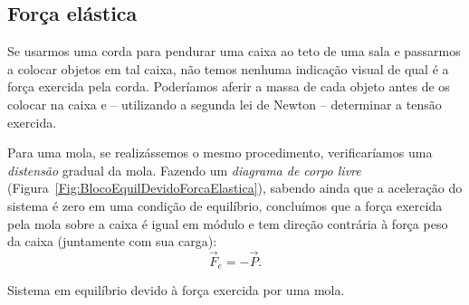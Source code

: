\subsection{Força elástica}

Se usarmos uma corda para pendurar uma caixa ao teto de uma sala e passarmos a colocar objetos em tal caixa, não temos nenhuma indicação visual de qual é a força exercida pela corda. Poderíamos aferir a massa de cada objeto antes de os colocar na caixa e -- utilizando a segunda lei de Newton -- determinar a tensão exercida.

Para uma mola, se realizássemos o mesmo procedimento, verificaríamos uma \emph{distensão} gradual da mola. Fazendo um \emph{diagrama de corpo livre} (Figura~\ref{Fig:BlocoEquilDevidoForcaElastica}), sabendo ainda que a aceleração do sistema é zero em uma condição de equilíbrio, concluímos que a força exercida pela mola sobre a caixa é igual em módulo e tem direção contrária à força peso da caixa (juntamente com sua carga):
\begin{equation}
	\vec{F}_e = -\vec{P}.
\end{equation}

\begin{marginfigure}
\centering
{}
\caption{Sistema em equilíbrio devido à força exercida por uma mola.\label{Fig:BlocoEquilDevidoForcaElastica}}
\end{marginfigure}

